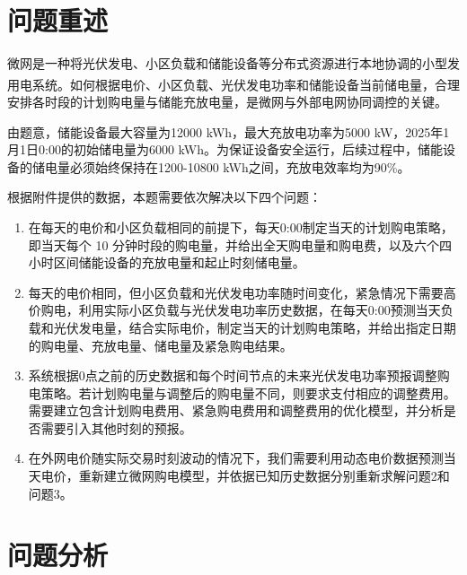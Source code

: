 \documentclass[UTF8]{ctexart}
\let\oldcite\cite
\renewcommand{\cite}[1]{\textsuperscript{\oldcite{#1}}}
\begin{document}
    \clearpage
    
    \pagestyle{plain}
    
    \section{问题重述}
    
    微网是一种将光伏发电、小区负载和储能设备等分布式资源进行本地协调的小型发用电系统\cite{ZJMD202108005}。如何根据电价、小区负载、光伏发电功率和储能设备当前储电量，合理安排各时段的计划购电量与储能充放电量，是微网与外部电网协同调控的关键。\par
    
    由题意，储能设备最大容量为12000 kWh，最大充放电功率为5000 kW，2025年1月1日0:00的初始储电量为6000 kWh。为保证设备安全运行，后续过程中，储能设备的储电量必须始终保持在1200-10800 kWh之间，充放电效率均为90\%。\par
    
    根据附件提供的数据，本题需要依次解决以下四个问题：
    
    \begin{enumerate}
        \item [(1)] 在每天的电价和小区负载相同的前提下，每天0:00制定当天的计划购电策略，即当天每个 10 分钟时段的购电量，并给出全天购电量和购电费，以及六个四小时区间储能设备的充放电量和起止时刻储电量。
        
        \item [(2)] 每天的电价相同，但小区负载和光伏发电功率随时间变化，紧急情况下需要高价购电，利用实际小区负载与光伏发电功率历史数据，在每天0:00预测当天负载和光伏发电量，结合实际电价，制定当天的计划购电策略，并给出指定日期的购电量、充放电量、储电量及紧急购电结果。
        
        \item [(3)] 系统根据0点之前的历史数据和每个时间节点的未来光伏发电功率预报调整购电策略。若计划购电量与调整后的购电量不同，则要求支付相应的调整费用。
        需要建立包含计划购电费用、紧急购电费用和调整费用的优化模型，并分析是否需要引入其他时刻的预报。
        
        \item [(4)] 在外网电价随实际交易时刻波动的情况下，我们需要利用动态电价数据预测当天电价，重新建立微网购电模型，并依据已知历史数据分别重新求解问题2和问题3。
    \end{enumerate}
    
    \section{问题分析}
    
\end{document}
